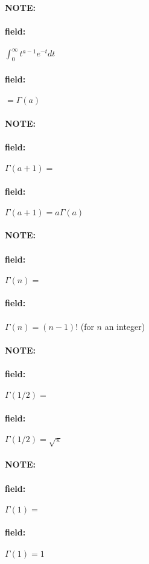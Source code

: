 \documentclass[12pt]{article}
\newenvironment{note}{\paragraph{NOTE:}}{}
\newenvironment{field}{\paragraph{field:}}{}
\begin{document}
\begin{note}
  \begin{field}
    $\int_0^\infty t^{a-1}e^{-t}dt $
  \end{field}
  \begin{field}
    $= \Gamma(a) $
  \end{field}
\end{note}


\begin{note}
  \begin{field}
    $\Gamma(a + 1) = $
  \end{field}
  \begin{field}
    $\Gamma(a + 1) = a\Gamma(a)$
  \end{field}
\end{note}

\begin{note}
  \begin{field}
    $\Gamma(n) = $
  \end{field}
  \begin{field}
    $\Gamma(n) = (n-1)!$ (for $n$ an integer)
  \end{field}
\end{note}

\begin{note}
  \begin{field}
    $\Gamma(1/2) = $
  \end{field}
  \begin{field}
    $\Gamma(1/2) = \sqrt{\pi}$
  \end{field}
\end{note}

\begin{note}
  \begin{field}
    $\Gamma(1) = $
  \end{field}
  \begin{field}
    $\Gamma(1) = 1$
  \end{field}
\end{note}





\end{document}
